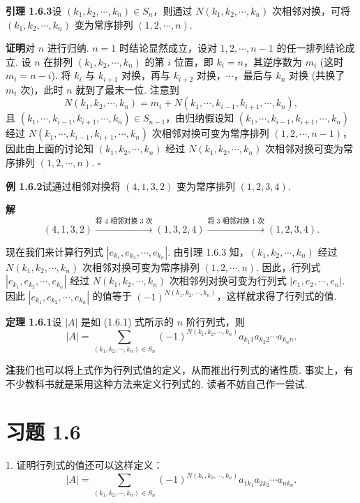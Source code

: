 \documentclass[UTF8,12pt,a4paper,fontset=fandol]{ctexart}
\begin{document}
\noindent\textbf{引理 1.6.3}\quad 设 $(k_1,k_2,\cdots,k_n)\in S_n$，则通过 $N(k_1,k_2,\cdots,k_n)$ 次相邻对换，可将 $(k_1,k_2,\cdots,k_n)$ 变为常序排列 $(1,2,\cdots,n)$.

\noindent\textbf{证明}\quad 对 $n$ 进行归纳. $n=1$ 时结论显然成立，设对 $1,2,\cdots,n-1$ 的任一排列结论成立. 设 $n$ 在排列 $(k_1,k_2,\cdots,k_n)$ 的第 $i$ 位置，即 $k_i=n$，其逆序数为 $m_i$ (这时 $m_i=n-i$). 将 $k_i$ 与 $k_{i+1}$ 对换，再与 $k_{i+2}$ 对换，$\cdots$，最后与 $k_n$ 对换 (共换了 $m_i$ 次)，此时 $n$ 就到了最末一位. 注意到
\[
N(k_1,k_2,\cdots,k_n)=m_i+N(k_1,\cdots,k_{i-1},k_{i+1},\cdots,k_n),
\]
且 $(k_1,\cdots,k_{i-1},k_{i+1},\cdots,k_n)\in S_{n-1}$，由归纳假设知 $(k_1,\cdots,k_{i-1},k_{i+1},\cdots,k_n)$ 经过 $N(k_1,\cdots,k_{i-1},k_{i+1},\cdots,k_n)$ 次相邻对换可变为常序排列 $(1,2,\cdots,n-1)$，因此由上面的讨论知 $(k_1,k_2,\cdots,k_n)$ 经过 $N(k_1,k_2,\cdots,k_n)$ 次相邻对换可变为常序排列 $(1,2,\cdots,n)$. \(\square\)

\noindent\textbf{例 1.6.2}\quad 试通过相邻对换将 $(4,1,3,2)$ 变为常序排列 $(1,2,3,4)$.

\noindent\textbf{解}\quad
\[
(4,1,3,2)\xrightarrow{\text{将 4 相邻对换 3 次}}(1,3,2,4)
\xrightarrow{\text{将 3 相邻对换 1 次}}(1,2,3,4).
\]

现在我们来计算行列式 $|e_{k_1},e_{k_2},\cdots,e_{k_n}|$. 由引理 1.6.3 知，$(k_1,k_2,\cdots,k_n)$ 经过 $N(k_1,k_2,\cdots,k_n)$ 次相邻对换可变为常序排列 $(1,2,\cdots,n)$. 因此，行列式 $|e_{k_1},e_{k_2},\cdots,e_{k_n}|$ 经过 $N(k_1,k_2,\cdots,k_n)$ 次相邻列对换可变为行列式 $|e_1,e_2,\cdots,e_n|$. 因此 $|e_{k_1},e_{k_2},\cdots,e_{k_n}|$ 的值等于 $(-1)^{N(k_1,k_2,\cdots,k_n)}$，这样就求得了行列式的值.

\noindent\textbf{定理 1.6.1}\quad 设 $|A|$ 是如 (1.6.1) 式所示的 $n$ 阶行列式，则
\begin{equation}
|A|=\sum_{(k_1,k_2,\cdots,k_n)\in S_n}
(-1)^{N(k_1,k_2,\cdots,k_n)}
a_{k_1 1}a_{k_2 2}\cdots a_{k_n n}.
\tag{1.6.2}
\end{equation}

\noindent\textbf{注}\quad 我们也可以将上式作为行列式值的定义，从而推出行列式的诸性质. 事实上，有不少教科书就是采用这种方法来定义行列式的. 读者不妨自己作一尝试.

\section*{习题 1.6}

1. 证明行列式的值还可以这样定义：
\begin{equation}
|A|=\sum_{(k_1,k_2,\cdots,k_n)\in S_n}
(-1)^{N(k_1,k_2,\cdots,k_n)}
a_{1k_1}a_{2k_2}\cdots a_{nk_n}.
\tag{1.6.3}
\end{equation}
\end{document}
